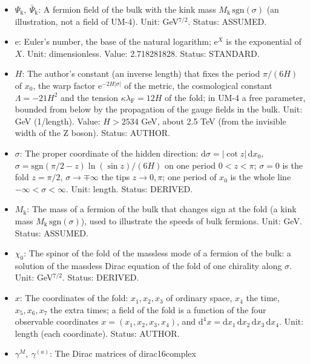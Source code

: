 \documentclass[
  10pt,
]{article}
\providecommand{\tightlist}{%
  \setlength{\itemsep}{0pt}\setlength{\parskip}{0pt}}
\begin{document}
\begin{itemize}
\tightlist
\item
  \(\Psi_{\mathrm{k}},\ \bar\Psi_{\mathrm{k}}\): A fermion field of the
  bulk with the kink mass \(M_{\mathrm{k}}\,\mathrm{sgn}(\sigma)\) (an
  illustration, not a field of UM-4). Unit: GeV\(^{7/2}\). Status:
  ASSUMED.
\item
  \(\mathrm{e}\): Euler's number, the base of the natural logarithm;
  \(\mathrm{e}^{X}\) is the exponential of \(X\). Unit: dimensionless.
  Value: 2.718281828. Status: STANDARD.
\item
  \(H\): The author's constant (an inverse length) that fixes the period
  \(\pi/(6H)\) of \(x_0\), the warp factor
  \(\mathrm{e}^{-2H\lvert\sigma\rvert}\) of the metric, the cosmological
  constant \(\Lambda = -21H^2\) and the tension
  \(\kappa\lambda_{\mathrm{F}} = 12H\) of the fold; in UM-4 a free
  parameter, bounded from below by the propagation of the gauge fields
  in the bulk. Unit: GeV (1/length). Value: \(H > 2534\) GeV, about 2.5
  TeV (from the invisible width of the Z boson). Status: AUTHOR.
\item
  \(\sigma\): The proper coordinate of the hidden direction:
  \(\mathrm{d}\sigma = \lvert\cot z\rvert\,\mathrm{d}x_0\),
  \(\sigma = \mathrm{sgn}(\pi/2 - z)\ln(\sin z)/(6H)\) on one period
  \(0 < z < \pi\); \(\sigma = 0\) is the fold \(z = \pi/2\),
  \(\sigma \to \mp\infty\) the tips \(z \to 0, \pi\); one period of
  \(x_0\) is the whole line \(-\infty < \sigma < \infty\). Unit: length.
  Status: DERIVED.
\item
  \(M_{\mathrm{k}}\): The mass of a fermion of the bulk that changes
  sign at the fold (a kink mass
  \(M_{\mathrm{k}}\,\mathrm{sgn}(\sigma)\)), used to illustrate the
  speeds of bulk fermions. Unit: GeV. Status: ASSUMED.
\item
  \(\chi_0\): The spinor of the fold of the massless mode of a fermion
  of the bulk: a solution of the massless Dirac equation of the fold of
  one chirality along \(\sigma\). Unit: GeV\(^{7/2}\). Status: DERIVED.
\item
  \(x\): The coordinates of the fold: \(x_1, x_2, x_3\) of ordinary
  space, \(x_4\) the time, \(x_5, x_6, x_7\) the extra times; a field of
  the fold is a function of the four observable coordinates
  \(x = (x_1, x_2, x_3, x_4)\), and
  \(\mathrm{d}^4x = \mathrm{d}x_1\,\mathrm{d}x_2\,\mathrm{d}x_3\,\mathrm{d}x_4\).
  Unit: length (each coordinate). Status: AUTHOR.
\item
  \(\gamma^M,\ \gamma^{(a)}\): The Dirac matrices of dirac16complex

\end{itemize}
\end{document}
